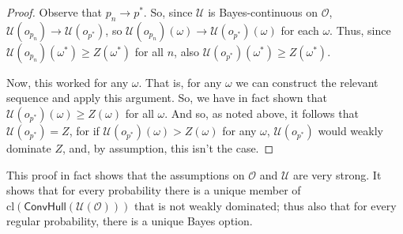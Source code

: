 \documentclass[a4paper,final]{article}
\newcommand\cl{\mathrm{cl}}
\renewcommand\O{\mathcal{O}}
\newcommand\Uwald{\mathcal{U}} %
\newcommand{\Conv}{\mathsf{ConvHull}}
\renewcommand{\geq}{\geqslant}
\newenvironment{CCM rewritten}
{\begingroup\color{blue}} %
{\endgroup}              %
\begin{document}
\begin{proof}
		
		Observe that $p_n\longrightarrow p^*$. So, since $\Uwald$ is Bayes-continuous on $\O$, $\Uwald(o_{p_n})\longrightarrow \Uwald(o_{p^*})$, so $\Uwald(o_{p_n})({\omega})\longrightarrow \Uwald(o_{p^*})({\omega})$ for each ${\omega}$. Thus, since $\Uwald(o_{p_n})({\omega^*})\geq Z({\omega^*})$ for all $n$, also $\Uwald(o_{p^*})(\omega^*)\geq Z(\omega^*)$. 
		
		Now, this worked for any $\omega$. That is, for any $\omega$ we can construct the relevant sequence and apply this argument. So, we have in fact shown that $\Uwald(o_{p^*})(\omega)\geq Z(\omega)$ for all $\omega$. And so, as noted above, it follows that $\Uwald(o_{p^*})=Z$, for if $\Uwald(o_{p^*})(\omega) > Z(\omega)$ for any $\omega$, $\Uwald(o_{p^*})$ would weakly dominate $Z$, and, by assumption, this isn't the case.
	\end{proof}
	This proof in fact shows that the assumptions on $\O$ and $\Uwald$ are very strong. It shows that for every probability there is a unique member of $\cl(\Conv(\Uwald(\O)))$ that is not weakly dominated; thus also that for every regular probability, there is a unique Bayes option. 
	
\end{document}
